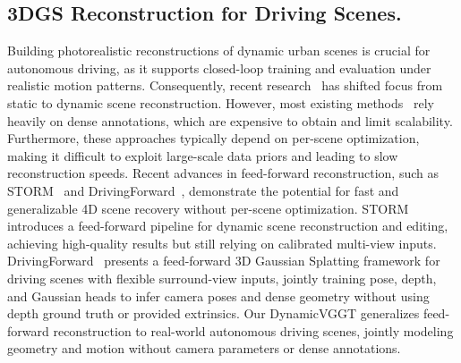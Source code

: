 \subsection{3DGS Reconstruction for Driving Scenes.}
Building photorealistic reconstructions of dynamic urban scenes is crucial for autonomous driving, as it supports closed-loop training and evaluation under realistic motion patterns. Consequently, recent research~\cite{yan2024street} has shifted focus from static to dynamic scene reconstruction. However, most existing methods~\cite{chen2024omnire, zhou2024hugs} rely heavily on dense annotations, which are expensive to obtain and limit scalability. Furthermore, these approaches typically depend on per-scene optimization, making it difficult to exploit large-scale data priors and leading to slow reconstruction speeds.
Recent advances in feed-forward reconstruction, such as STORM~\cite{yang2024storm} and DrivingForward~\cite{tian2025drivingforward}, demonstrate the potential for fast and generalizable 4D scene recovery without per-scene optimization.
STORM introduces a feed-forward pipeline for dynamic scene reconstruction and editing, achieving high-quality results but still relying on calibrated multi-view inputs.
DrivingForward~\cite{tian2025drivingforward} presents a feed-forward 3D Gaussian Splatting framework for driving scenes with flexible surround-view inputs, jointly training pose, depth, and Gaussian heads to infer camera poses and dense geometry without using depth ground truth or provided extrinsics. Our DynamicVGGT generalizes feed-forward reconstruction to real-world autonomous driving scenes, jointly modeling geometry and motion without camera parameters or dense annotations.


